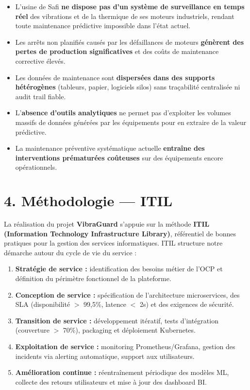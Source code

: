 \documentclass[12pt, a4paper, oneside]{report}
\newcommand{\projectname}{\textbf{VibraGuard}}
\begin{document}
\begin{itemize}
  \item L'usine de Safi \textbf{ne dispose pas d'un système de surveillance en temps réel}
  des vibrations et de la thermique de ses moteurs industriels, rendant toute maintenance
  prédictive impossible dans l'état actuel.
  \item Les arrêts non planifiés causés par les défaillances de moteurs \textbf{génèrent des
  pertes de production significatives} et des coûts de maintenance corrective élevés.
  \item Les données de maintenance sont \textbf{dispersées dans des supports hétérogènes}
  (tableurs, papier, logiciels silos) sans traçabilité centralisée ni audit trail fiable.
  \item L'\textbf{absence d'outils analytiques} ne permet pas d'exploiter les volumes
  massifs de données générées par les équipements pour en extraire de la valeur prédictive.
  \item La maintenance préventive systématique actuelle \textbf{entraîne des interventions
  prématurées coûteuses} sur des équipements encore opérationnels.
\end{itemize}

\section*{4. Méthodologie --- ITIL}

La réalisation du projet \projectname{} s'appuie sur la méthode \textbf{ITIL (Information
Technology Infrastructure Library)}, référentiel de bonnes pratiques pour la gestion des
services informatiques. ITIL structure notre démarche autour du cycle de vie du service :

\begin{enumerate}
  \item \textbf{Stratégie de service :} identification des besoins métier de l'OCP et
  définition du périmètre fonctionnel de la plateforme.
  \item \textbf{Conception de service :} spécification de l'architecture microservices,
  des SLA (disponibilité $>$ 99,5\%, latence $<$ 2s) et des exigences de sécurité.
  \item \textbf{Transition de service :} développement itératif, tests d'intégration (couverture
  $>$ 70\%), packaging et déploiement Kubernetes.
  \item \textbf{Exploitation de service :} monitoring Prometheus/Grafana, gestion des incidents
  via alerting automatique, support aux utilisateurs.
  \item \textbf{Amélioration continue :} réentraînement périodique des modèles ML, collecte
  des retours utilisateurs et mise à jour des dashboard BI.
\end{enumerate}
\end{document}
